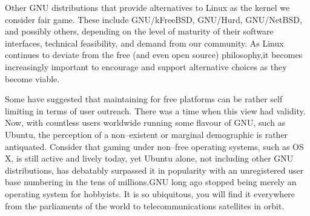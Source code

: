 Other GNU distributions that provide alternatives to Linux as the kernel we consider fair game. These include GNU/kFreeBSD, GNU/Hurd, GNU/NetBSD, and possibly others, depending on the level of maturity of their software interfaces, technical feasibility, and demand from our community. As Linux continues to deviate from the free (and even open source) philosophy, it becomes increasingly important to encourage and support alternative choices as they become viable.

Some have suggested that maintaining for free platforms can be rather self limiting in terms of user outreach. There was a time when this view had validity. Now, with countless users worldwide running some flavour of GNU, such as Ubuntu, the perception of a non--existent or marginal demographic is rather antiquated. Consider that gaming under non--free operating systems, such as OS X, is still active and lively today, yet Ubuntu alone, not including other GNU distributions, has debatably   surpassed it in popularity with an unregistered user base numbering in the tens of millions. GNU long ago stopped being merely an operating system for hobbyists. It is so ubiquitous, you will find it everywhere from the parliaments of the world to telecommunications satellites in orbit.

\StopChapter

